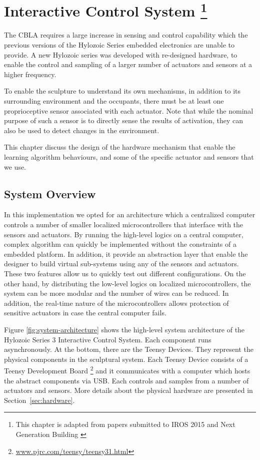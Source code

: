 \chapter[Interactive Control System]
{Interactive Control System 
	\footnote{This chapter is adapted from papers submitted to IROS 2015 \cite{Chan2015} and Next Generation Building \cite{Gorbet2015}}} 
\label{chap:ctrl_system}

The CBLA requires a large increase in sensing and control capability which the previous versions of the Hylozoic Series embedded electronics \cite{Beesley2007.book} are unable to provide. A new Hylozoic series was developed with re-designed hardware, to enable the control and sampling of a larger number of actuators and sensors at a higher frequency. 

To enable the sculpture to understand its own mechanisms, in addition to its surrounding environment and the occupants, there must be at least one proprioceptive sensor associated with each actuator. Note that while the nominal purpose of such a sensor is to directly sense the results of activation, they can also be used to detect changes in the environment.

This chapter discuss the design of the hardware mechanism that enable the learning algorithm behaviours, and some of the specific actuator and sensors that we use. 


\section{System Overview}

In this implementation we opted for an architecture which a centralized computer controls a number of smaller localized microcontrollers that interface with the sensors and actuators. By running the high-level logics on a central computer, complex algorithm can quickly be implemented without the constraints of a embedded platform. In addition, it provide an abstraction layer that enable the designer to build virtual sub-systems using any of the sensors and actuators. These two features allow us to quickly test out different configurations. 
On the other hand, by distributing the low-level logics on localized microcontrollers, the system can be more modular and the number of wires can be reduced. In addition, the real-time nature of the microcontrollers allows protection of sensitive actuators in case the central computer fails. 


Figure \ref{fig:system-architecture} shows the high-level system architecture of the Hylozoic Series 3 Interactive Control System. Each component runs asynchronously. At the bottom, there are the Teensy Devices. They represent the physical components in the sculptural system. Each Teensy Device consists of a Teensy Development Board \footnote{\url{www.pjrc.com/teensy/teensy31.html}} and it communicates with a computer which hosts the abstract components via USB. Each controls and samples from a number of actuators and sensors. More details about the physical hardware are presented in Section~\ref{sec:hardware}. 

